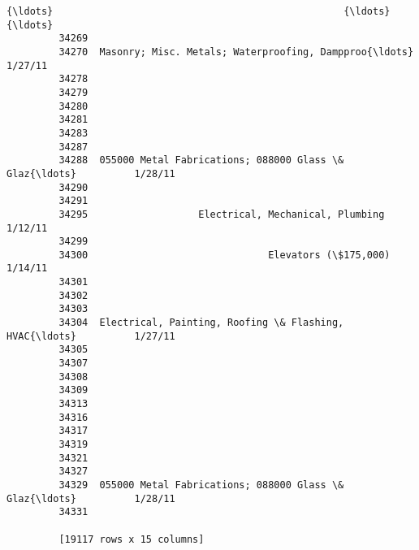 \documentclass[11pt]{article}
\begin{document}
\begin{Verbatim}[commandchars=\\\{\}]
         {\ldots}                                                  {\ldots}              {\ldots}  
         34269                                                                      
         34270  Masonry; Misc. Metals; Waterproofing, Dampproo{\ldots}          1/27/11  
         34278                                                                      
         34279                                                                      
         34280                                                                      
         34281                                                                      
         34283                                                                      
         34287                                                                      
         34288  055000 Metal Fabrications; 088000 Glass \& Glaz{\ldots}          1/28/11  
         34290                                                                      
         34291                                                                      
         34295                   Electrical, Mechanical, Plumbing          1/12/11  
         34299                                                                      
         34300                               Elevators (\$175,000)          1/14/11  
         34301                                                                      
         34302                                                                      
         34303                                                                      
         34304  Electrical, Painting, Roofing \& Flashing, HVAC{\ldots}          1/27/11  
         34305                                                                      
         34307                                                                      
         34308                                                                      
         34309                                                                      
         34313                                                                      
         34316                                                                      
         34317                                                                      
         34319                                                                      
         34321                                                                      
         34327                                                                      
         34329  055000 Metal Fabrications; 088000 Glass \& Glaz{\ldots}          1/28/11  
         34331                                                                      
         
         [19117 rows x 15 columns]
\end{Verbatim}
            
\end{document}
